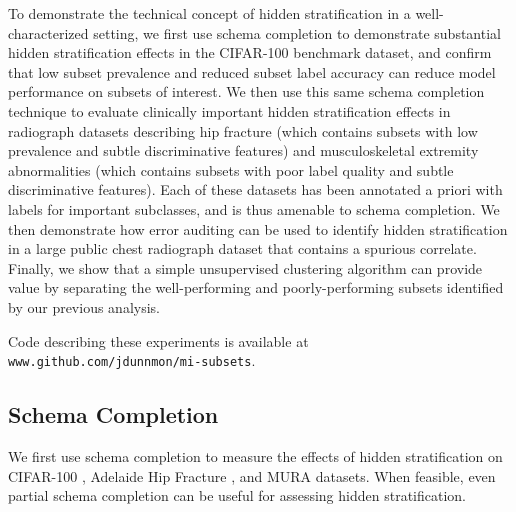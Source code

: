 \documentclass[sigconf]{acmart}
\begin{document}
To demonstrate the technical concept of hidden stratification in a well-characterized setting, we first use schema completion to demonstrate substantial hidden stratification effects in the CIFAR-100 benchmark dataset, and confirm that low subset prevalence and reduced subset label accuracy can reduce model performance on subsets of interest.
We then use this same schema completion technique to evaluate clinically important hidden stratification effects in radiograph datasets describing hip fracture (which contains subsets with low prevalence and subtle discriminative features) and musculoskeletal extremity abnormalities (which contains subsets with poor label quality and subtle discriminative features).
Each of these datasets has been annotated a priori with labels for important subclasses, and is thus amenable to schema completion.
We then demonstrate how error auditing can be used to identify hidden stratification in a large public chest radiograph dataset that contains a spurious correlate.
Finally, we show that a simple unsupervised clustering algorithm can provide value by separating the well-performing and poorly-performing subsets identified by our previous analysis.

Code describing these experiments is available at  \\ \texttt{www.github.com/jdunnmon/mi-subsets}.

\subsection{Schema Completion}

We first use schema completion to measure the effects of hidden stratification on CIFAR-100 \citep{Krizhevsky2009-tq}, Adelaide Hip Fracture \citep{Gale_W_Oakden-Rayner_L_Carneiro_G_Bradley_AP_Palmer_LJ2017-tl},  and MURA \citep{Rajpurkar2017-rc} datasets.
When feasible, even partial schema completion can be useful for assessing hidden stratification.
\end{document}
